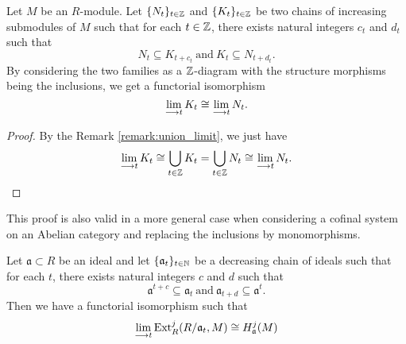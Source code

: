 \documentclass[11pt, a4paper, twoside]{article}
\begin{document}
\begin{prop}\label{prop:cat_1}
    Let $M$ be an $R$-module. Let $\{N_t\}_{t\in\mathbb{Z}}$ and $\{K_t\}_{t\in\mathbb{Z}}$ be two chains of increasing submodules of $M$ such that for each $t\in\mathbb{Z}$, there exists natural integers $c_t$ and $d_t$ such that 
    \begin{displaymath}
        N_t\subseteq K_{t+c_t}\ \mathrm{and}\ K_t\subseteq N_{t+d_t}.
    \end{displaymath}
    By considering the two families as a $\mathbb{Z}$-diagram with the structure morphisms being the inclusions, we get a functorial isomorphism
    \begin{displaymath}
        \lim\limits_{\longrightarrow t}K_t\cong\lim\limits_{\longrightarrow t}N_t.
    \end{displaymath}
\end{prop}
\begin{proof}
    By the Remark \ref{remark:union_limit}, we just have
    \begin{displaymath}
        \lim\limits_{\longrightarrow t}K_t\cong\bigcup_{t\in\mathbb{Z}}K_t=\bigcup_{t\in\mathbb{Z}}N_t\cong\lim\limits_{\longrightarrow t}N_t.
    \end{displaymath}
\end{proof}
\begin{remark}
    This proof is also valid in a more general case when considering a cofinal system on an Abelian category and replacing the inclusions by monomorphisms.
\end{remark}
\begin{cor}\label{cor:cat_2}
    Let $\mathfrak{a}\subset R$ be an ideal and let $\{\mathfrak{a}_t\}_{t\in\mathbb{N}}$ be a decreasing chain of ideals such that for each $t$, there exists natural integers $c$ and $d$ such that 
    \begin{displaymath}
        \mathfrak{a}^{t+c}\subseteq\mathfrak{a}_t\ \mathrm{and}\ \mathfrak{a}_{t+d}\subseteq\mathfrak{a}^t.
    \end{displaymath}
    Then we have a functorial isomorphism such that
    \begin{displaymath}
        \lim\limits_{\longrightarrow t}\operatorname{Ext}^j_R(R/\mathfrak{a}_t,M)\cong H_{\mathfrak{a}}^j(M)
    \end{displaymath}
\end{cor}
\end{document}
